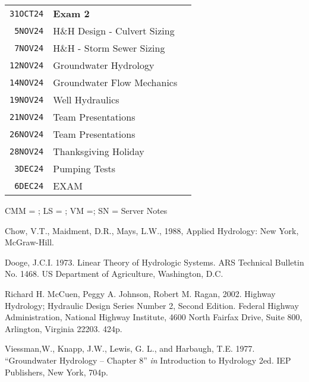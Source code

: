 \documentclass[12pt]{article}
\begin{document}
\begin{table}[ht!]
\begin{tabular}{p{0.5in}p{3in}p{2.5in}}
\texttt{31OCT24} & \textbf{Exam 2} & \\ %
\texttt{~5NOV24} & H\&H Design - Culvert Sizing &  \\ %
\texttt{~7NOV24} & H\&H - Storm Sewer Sizing &   \\ %
\texttt{12NOV24} & Groundwater Hydrology &  \\ %
\texttt{14NOV24} & Groundwater Flow Mechanics & \\ %
\texttt{19NOV24} & Well Hydraulics &  \\ %
\texttt{21NOV24} & Team Presentations &  \\ %
\texttt{26NOV24} & Team Presentations &  \\ %
\texttt{28NOV24} & Thanksgiving Holiday &    \\ %
\texttt{~3DEC24} & Pumping Tests & \\ %
\texttt{~6DEC24} & EXAM  &  \\ %
\hline
\hline
   \end{tabular}
   \label{tab:fall2013schedule}
\end{table}
CMM = \cite{CMM1988}; 
LS = \cite{Dooge1973} ;
VM =\cite{Viessman1977};
SN = Server Notes 

\clearpage



\begin{thebibliography}{}

Chow, V.T., Maidment, D.R., Mays, L.W., 1988, Applied Hydrology: New York,
McGraw-Hill.

Dooge, J.C.I. 1973.  Linear Theory of Hydrologic Systems. ARS Technical Bulletin No. 1468.  US Department of Agriculture, Washington, D.C.

Richard H. McCuen, Peggy A. Johnson, Robert M. Ragan, 2002.  Highway Hydrology; Hydraulic Design Series Number 2, Second Edition.  
Federal Highway Administration, National Highway Institute, 4600 North Fairfax Drive, Suite 800, Arlington, Virginia 22203.  424p.

Viessman,W., Knapp, J.W., Lewis, G. L., and Harbaugh, T.E. 1977. ``Groundwater Hydrology -- Chapter 8''  \textsl{in} Introduction to Hydrology 2ed. IEP Publishers, New York, 704p.


\end{thebibliography}
\end{document}
